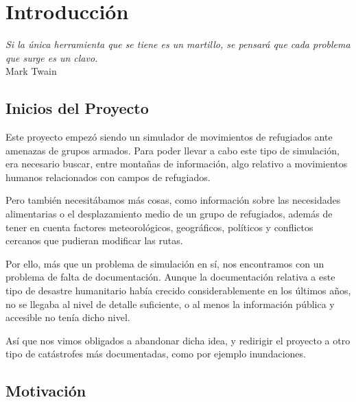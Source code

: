 
\chapter*{Introducción} \label{cap0}


\begin{flushright}
\begin{minipage}{7.85cm}
    {\em Si la única herramienta que se tiene es un martillo, se pensará que
    cada problema que surge es un clavo.} \\  Mark Twain
\end{minipage}
\end{flushright}

\vspace*{5mm}

\section*{Inicios del Proyecto}

Este proyecto empezó siendo un simulador de movimientos de refugiados ante
amenazas de grupos armados. Para poder llevar a cabo este tipo de simulación,
era necesario buscar, entre montañas de información, algo relativo a movimientos
humanos relacionados con campos de refugiados\cite{Wenona04}.

Pero también necesitábamos más cosas, como información sobre las necesidades
alimentarias o el desplazamiento medio de un grupo de refugiados, además de
tener en cuenta factores meteorológicos, geográficos, políticos y conflictos
cercanos que pudieran modificar las rutas.

Por ello, más que un problema de simulación en sí, nos encontramos con un
problema de falta de documentación. Aunque la documentación relativa a este tipo
de desastre humanitario había crecido considerablemente en los últimos años,
no se llegaba al nivel de detalle suficiente, o al menos la información pública
y accesible no tenía dicho nivel.

Así que nos vimos obligados a abandonar dicha idea, y redirigir el proyecto a
otro tipo de catástrofes más documentadas, como por ejemplo inundaciones.

\section*{Motivación}

